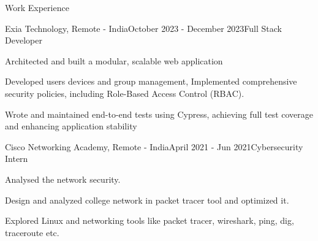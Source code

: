 \documentclass{resume} %
\begin{document}

    
    

\begin{rSection}{Work Experience}
    \begin{rSubsection}{Exia Technology, Remote - India}{October 2023 - December 2023}{Full Stack Developer}{}
     \item Architected and built a modular, scalable web application 
     \item Developed users devices and group management, Implemented comprehensive security policies, including Role-Based Access Control (RBAC).
     \item Wrote and maintained end-to-end tests using Cypress, achieving full test coverage and enhancing application stability
    \end{rSubsection}
    \begin{rSubsection}{Cisco Networking Academy, Remote - India}{April 2021 - Jun 2021}{Cybersecurity Intern}{}
        \item Analysed the network security.
        \item Design and analyzed college network in packet tracer tool and optimized it.
        \item Explored Linux and networking tools like packet tracer, wireshark, ping, dig, traceroute etc.
       \end{rSubsection}
\end{rSection}




\end{document}
